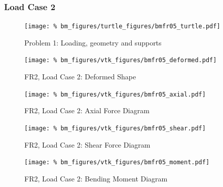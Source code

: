 %
%
\clearpage
\subsubsection{Load Case 2}
\begin{figure}[h]
    \texttt{[image: \%
                            bm\_figures/turtle\_figures/bmfr05\_turtle.pdf]}
    \centering
    \caption{Problem 1: Loading, geometry and supports}
    \label{fig:bmfr05_turtle}
\end{figure}


\begin{figure}[!htb]
    \texttt{[image: \%
                     bm\_figures/vtk\_figures/bmfr05\_deformed.pdf]}
    \centering
    \caption{FR2, Load Case 2: Deformed Shape}
    \label{fig:bmfr05_deformed}
\end{figure}
\begin{figure}[!htb]
    \texttt{[image: \%
                     bm\_figures/vtk\_figures/bmfr05\_axial.pdf]}
    \centering
    \caption{FR2, Load Case 2: Axial Force Diagram}
    \label{fig:bmfr05_shear}
\end{figure}
\begin{figure}[!htb]
    \texttt{[image: \%
                     bm\_figures/vtk\_figures/bmfr05\_shear.pdf]}
    \centering
    \caption{FR2, Load Case 2: Shear Force Diagram}
    \label{fig:bmfr05_shear}
\end{figure}
\begin{figure}[!htb]
    \texttt{[image: \%
                     bm\_figures/vtk\_figures/bmfr05\_moment.pdf]}
    \centering
    \caption{FR2, Load Case 2: Bending Moment Diagram}
    \label{fig:bmfr05_moment}
\end{figure}
